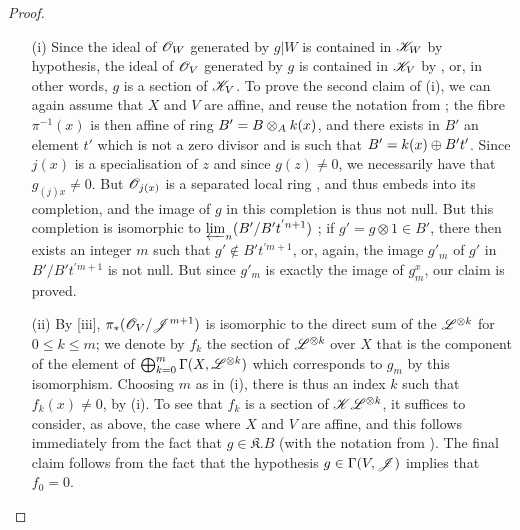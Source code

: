 \begin{proof}
\begin{enumerate}
    \item[\rm{(i)}] Since the ideal of $\mathscr{O}_W$ generated by $g|W$ is contained in $\mathscr{K}_W$ by hypothesis, the ideal of $\mathscr{O}_V$ generated by $g$ is contained in $\mathscr{K}_V$ by , or, in other words, $g$ is a section of $\mathscr{K}_V$.
        To prove the second claim of (i), we can again assume that $X$ and $V$ are affine, and reuse the notation from ;
        the fibre $\pi^{-1}(x)$ is then affine of ring $B'=B\otimes_Ak(x)$, and there exists in $B'$ an element $t'$ which is not a zero divisor and is such that $B'=k(x)\oplus B't'$.
        Since $j(x)$ is a specialisation of $z$ and since $g(z)\neq0$, we necessarily have that $g_{(j)x}\neq0$.
        But $\mathscr{O}_{j(x)}$ is a separated local ring , and thus embeds into its completion, and the image of $g$ in this completion is thus not null.
        But this completion is isomorphic to $\varprojlim_n(B'/B't^{'n+1})$ ;
        if $g'=g\otimes1\in B'$, there then exists an integer $m$ such that $g'\not\in B't^{'m+1}$, or, again, the image $g'_m$ of $g'$ in $B'/B't^{'m+1}$ is not null.
        But since $g'_m$ is exactly the image of $g_m^x$, our claim is proved.
    \item[\rm{(ii)}] By [iii], $\pi_*(\mathscr{O}_V/\mathscr{J}^{m+1})$ is isomorphic to the direct sum of the $\mathscr{L}^{\otimes k}$ for $0\leq k\leq m$;
        we denote by $f_k$ the section of $\mathscr{L}^{\otimes k}$ over $X$ that is the component of the element of $\bigoplus_{k=0}^m\Gamma(X,\mathscr{L}^{\otimes k})$ which corresponds to $g_m$ by this isomorphism.
        Choosing $m$ as in (i), there is thus an index $k$ such that $f_k(x)\neq0$, by (i).
        To see that $f_k$ is a section of $\mathscr{K}\mathscr{L}^{\otimes k}$, it suffices to consider, as above, the case where $X$ and $V$ are affine, and this follows immediately from the fact that $g\in\mathfrak{K}.B$ (with the notation from ).
        The final claim follows from the fact that the hypothesis $g\in\Gamma(V,\mathscr{J})$ implies that $f_0=0$.
\end{enumerate}
\end{proof}


